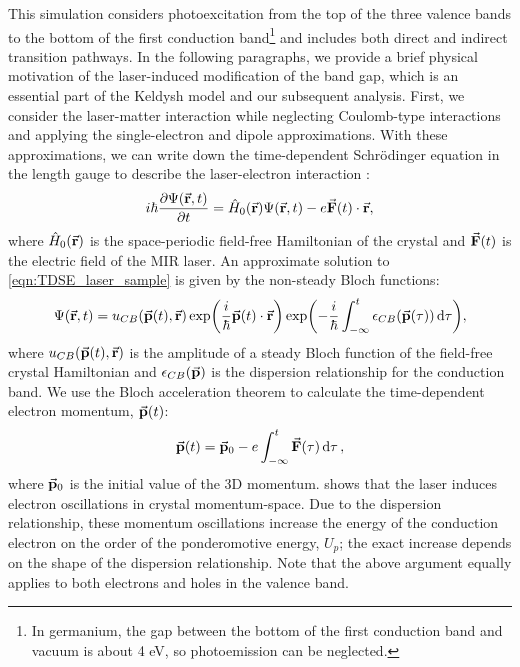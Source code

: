 This simulation considers photoexcitation from the top of the three valence bands to the bottom of the first conduction band\footnote{In germanium, the gap between the bottom of the first conduction band and vacuum is about 4 eV, so photoemission can be neglected.} and includes both direct and indirect transition pathways. In the following paragraphs, we provide a brief physical motivation of the laser-induced modification of the band gap, which is an essential part of the Keldysh model and our subsequent analysis. First, we consider the laser-matter interaction while neglecting Coulomb-type interactions and applying the single-electron and dipole approximations. With these approximations, we can write down the time-dependent Schr\"{o}dinger equation in the length gauge to describe the laser-electron interaction \cite{gruzdevUltrafastModificationBand2018}:
\begin{equation}
\label{eqn:TDSE_laser_sample}
i \hbar \pdv{\Psi(\va{r}, t)}{t} = \hat{H}_0 (\va{r}) \Psi(\va{r},t) - e \va{F}(t) \cdot \va{r},
\end{equation}
where $\hat{H}_0 (\va{r})$ is the space-periodic field-free Hamiltonian of the crystal and $\va{F}(t)$ is the electric field of the MIR laser. An approximate solution to \cref{eqn:TDSE_laser_sample} is given by the non-steady Bloch functions:
\begin{equation}
\Psi(\va{r}, t) = u_{CB}(\va{p}(t), \va{r}) \exp( \frac{i}{\hbar} \va{p}(t) \cdot \va{r}) \exp(- \frac{i}{\hbar} \int_{-\infty}^{t} \epsilon_{CB}(\va{p}(\tau)) \dd{\tau}),
\end{equation}
where $u_{CB}(\va{p}(t), \va{r})$ is the amplitude of a steady Bloch function of the field-free crystal Hamiltonian and $\epsilon_{CB}(\va{p})$ is the dispersion relationship for the conduction band. We use the Bloch acceleration theorem to calculate the time-dependent electron momentum, $\va{p}(t)$:
\begin{equation}
\label{eqn:TD_electron_momentum}
\va{p}(t) = \va{p}_0 - e \int_{-\infty}^{t} \va{F}(\tau) \dd{\tau},
\end{equation}
where $\va{p}_0$ is the initial value of the 3D momentum.  shows that the laser induces electron oscillations in crystal momentum-space. Due to the dispersion relationship, these momentum oscillations increase the energy of the conduction electron on the order of the ponderomotive energy, $U_p$; the exact increase depends on the shape of the dispersion relationship. Note that the above argument equally applies to both electrons and holes in the valence band.

